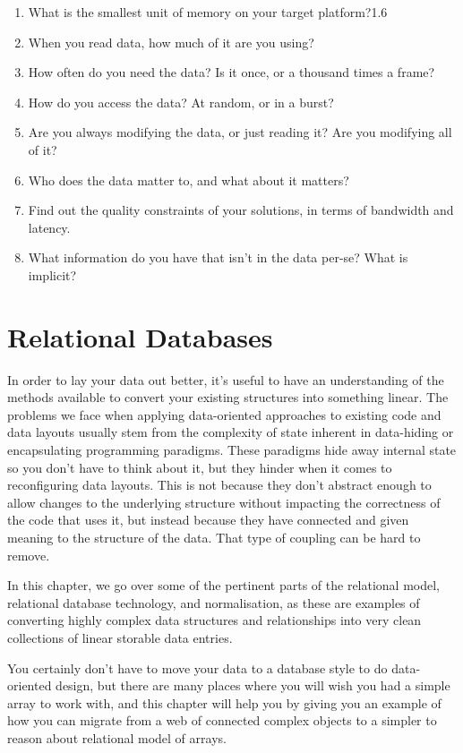 \documentclass[a4paper,12pt]{article}
\begin{document}
\begin{enumerate}
      \item
            What is the smallest unit of memory on your target platform?1.6
      \item
            When you read data, how much of it are you using?
      \item
            How often do you need the data? Is it once, or a thousand times a frame?
      \item
            How do you access the data? At random, or in a burst?
      \item
            Are you always modifying the data, or just reading it? Are you modifying all of it?
      \item
            Who does the data matter to, and what about it matters?
      \item
            Find out the quality constraints of your solutions, in terms of bandwidth and latency.
      \item
            What information do you have that isn't in the data per-se? What is implicit?
\end{enumerate}

\newpage
\section{Relational Databases}

In order to lay your data out better, it's useful to have an understanding of the methods available to convert your existing structures into something linear.
The problems we face when applying data-oriented approaches to existing code and data layouts usually stem from the complexity of state inherent in data-hiding or encapsulating programming paradigms.
These paradigms hide away internal state so you don't have to think about it, but they hinder when it comes to reconfiguring data layouts.
This is not because they don't abstract enough to allow changes to the underlying structure without impacting the correctness of the code that uses it, but instead because they have connected and given meaning to the structure of the data.
That type of coupling can be hard to remove.

In this chapter, we go over some of the pertinent parts of the relational model, relational database technology, and normalisation, as these are examples of converting highly complex data structures and relationships into very clean collections of linear storable data entries.

You certainly don't have to move your data to a database style to do data-oriented design, but there are many places where you will wish you had a simple array to work with, and this chapter will help you by giving you an example of how you can migrate from a web of connected complex objects to a simpler to reason about relational model of arrays.
\end{document}
